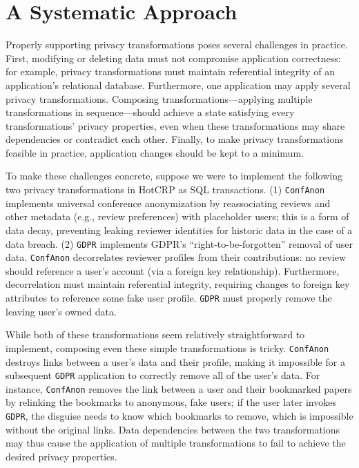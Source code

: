 \section{A Systematic Approach}%
Properly supporting privacy transformations poses several challenges in practice. First, modifying or
deleting data must not compromise application correctness: for example, privacy transformations must
maintain referential integrity of an application's relational database.
%
Furthermore, one application may apply several privacy transformations. Composing
transformations---applying multiple transformations in sequence---should achieve a state satisfying
every transformations' privacy properties, even when these transformations may share dependencies or
contradict each other.
%
Finally, to make privacy transformations feasible in practice, application changes should be kept to
a minimum.
%

%
To make these challenges concrete, suppose we were to implement the following two privacy
transformations in HotCRP as SQL transactions. (1) \texttt{ConfAnon} implements universal conference
anonymization by reassociating reviews and other metadata (e.g., review preferences) with
placeholder users; this is a form of data decay, preventing leaking reviewer identities for historic data in
the case of a data breach. (2) \texttt{GDPR} implements GDPR's ``right-to-be-forgotten'' removal of user data.
%
\texttt{ConfAnon} decorrelates reviewer profiles from their contributions: no review should reference a
user's account (via a foreign key relationship).
Furthermore, decorrelation must maintain referential integrity, requiring changes to foreign key
attributes to reference some fake user profile.
\texttt{GDPR} must properly remove the leaving user's owned data.

While both of these transformations seem relatively straightforward to implement, composing even
these simple transformations is tricky. \texttt{ConfAnon} destroys links between a user's data and
their profile, making it impossible for a subsequent \texttt{GDPR} application to correctly remove
all of the user's data. 
%
For instance, \texttt{ConfAnon} removes the link between a user and their bookmarked papers by
relinking the bookmarks to anonymous, fake users; if the user later invokes \texttt{GDPR}, the
disguise needs to know which bookmarks to remove, which is impossible without the 
original links.
%
Data dependencies between the two transformations may thus cause the application of multiple
transformations to fail to achieve the desired privacy properties.
%

